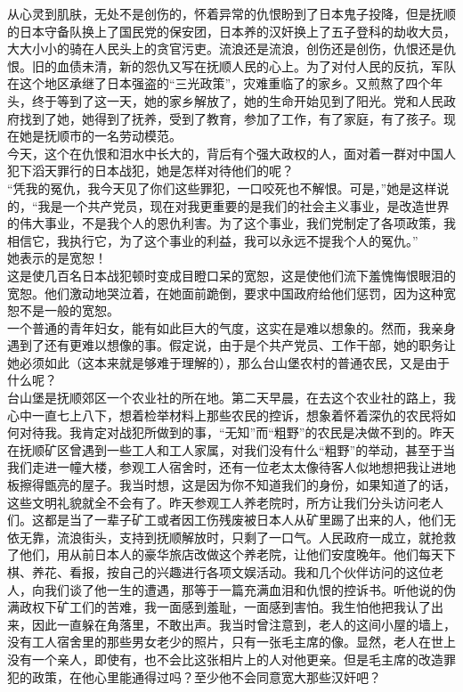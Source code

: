 从心灵到肌肤，无处不是创伤的，怀着异常的仇恨盼到了日本鬼子投降，但是抚顺的日本守备队换上了国民党的保安团，日本养的汉奸换上了五子登科的劫收大员，大大小小的骑在人民头上的贪官污吏。流浪还是流浪，创伤还是创伤，仇恨还是仇恨。旧的血债未清，新的怨仇又写在抚顺人民的心上。为了对付人民的反抗，军队在这个地区承继了日本强盗的“三光政策”，灾难重临了的家乡。又煎熬了四个年头，终于等到了这一天，她的家乡解放了，她的生命开始见到了阳光。党和人民政府找到了她，她得到了抚养，受到了教育，参加了工作，有了家庭，有了孩子。现在她是抚顺市的一名劳动模范。\\

今天，这个在仇恨和泪水中长大的，背后有个强大政权的人，面对着一群对中国人犯下滔天罪行的日本战犯，她是怎样对待他们的呢？\\

“凭我的冤仇，我今天见了你们这些罪犯，一口咬死也不解恨。可是，”她是这样说的，“我是一个共产党员，现在对我更重要的是我们的社会主义事业，是改造世界的伟大事业，不是我个人的恩仇利害。为了这个事业，我们党制定了各项政策，我相信它，我执行它，为了这个事业的利益，我可以永远不提我个人的冤仇。”\\

她表示的是宽恕！\\

这是使几百名日本战犯顿时变成目瞪口呆的宽恕，这是使他们流下羞愧悔恨眼泪的宽恕。他们激动地哭泣着，在她面前跪倒，要求中国政府给他们惩罚，因为这种宽恕不是一般的宽恕。\\

一个普通的青年妇女，能有如此巨大的气度，这实在是难以想象的。然而，我亲身遇到了还有更难以想像的事。假定说，由于是个共产党员、工作干部，她的职务让她必须如此（这本来就是够难于理解的），那么台山堡农村的普通农民，又是由于什么呢？\\

台山堡是抚顺郊区一个农业社的所在地。第二天早晨，在去这个农业社的路上，我心中一直七上八下，想着检举材料上那些农民的控诉，想象着怀着深仇的农民将如何对待我。我肯定对战犯所做到的事，“无知”而“粗野”的农民是决做不到的。昨天在抚顺矿区曾遇到一些工人和工人家属，对我们没有什么“粗野”的举动，甚至于当我们走进一幢大楼，参观工人宿舍时，还有一位老太太像待客人似地想把我让进地板擦得甑亮的屋子。我当时想，这是因为你不知道我们的身份，如果知道了的话，这些文明礼貌就全不会有了。昨天参观工人养老院时，所方让我们分头访问老人们。这都是当了一辈子矿工或者因工伤残废被日本人从矿里踢了出来的人，他们无依无靠，流浪街头，支持到抚顺解放时，只剩了一口气。人民政府一成立，就抢救了他们，用从前日本人的豪华旅店改做这个养老院，让他们安度晚年。他们每天下棋、养花、看报，按自己的兴趣进行各项文娱活动。我和几个伙伴访问的这位老人，向我们谈了他一生的遭遇，那等于一篇充满血泪和仇恨的控诉书。听他说的伪满政权下矿工们的苦难，我一面感到羞耻，一面感到害怕。我生怕他把我认了出来，因此一直躲在角落里，不敢出声。我当时曾注意到，老人的这间小屋的墙上，没有工人宿舍里的那些男女老少的照片，只有一张毛主席的像。显然，老人在世上没有一个亲人，即使有，也不会比这张相片上的人对他更亲。但是毛主席的改造罪犯的政策，在他心里能通得过吗？至少他不会同意宽大那些汉奸吧？\\

